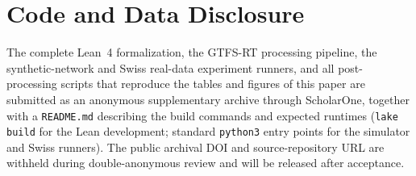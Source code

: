 \documentclass[opre,dblanonrev]{informs4}
\begin{document}
\section{Code and Data Disclosure}\label{sec:code-data}
The complete Lean~4 formalization, the GTFS-RT processing pipeline, the
synthetic-network and Swiss real-data experiment runners, and all
post-processing scripts that reproduce the tables and figures of
this paper are submitted as an anonymous supplementary archive
through ScholarOne, together with a \texttt{README.md} describing
the build commands and expected runtimes (\texttt{lake build} for
the Lean development; standard \texttt{python3} entry points for
the simulator and Swiss runners). The public archival DOI and
source-repository URL are withheld during double-anonymous review
and will be released after acceptance.
\end{document}
